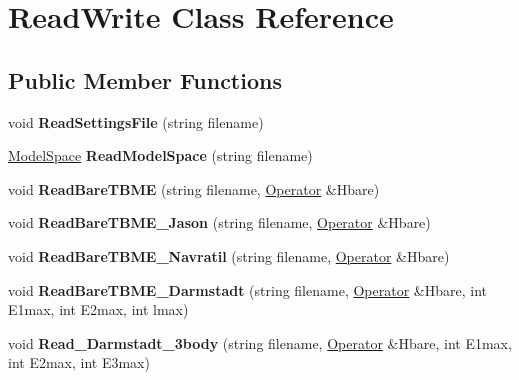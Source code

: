 \hypertarget{classReadWrite}{\section{Read\-Write Class Reference}
\label{classReadWrite}
}
\subsection*{Public Member Functions}
\begin{DoxyCompactItemize}
\item 
\hypertarget{classReadWrite_a7074f8c5e6b1bbeb90a4c534b913ac53}{void {\bfseries Read\-Settings\-File} (string filename)}\label{classReadWrite_a7074f8c5e6b1bbeb90a4c534b913ac53}

\item 
\hypertarget{classReadWrite_adbf1ad5fe47c97c87994cfc28df5c740}{\hyperlink{classModelSpace}{Model\-Space} {\bfseries Read\-Model\-Space} (string filename)}\label{classReadWrite_adbf1ad5fe47c97c87994cfc28df5c740}

\item 
\hypertarget{classReadWrite_a7ebe7ea4d8a322b23b144658da562277}{void {\bfseries Read\-Bare\-T\-B\-M\-E} (string filename, \hyperlink{classOperator}{Operator} \&Hbare)}\label{classReadWrite_a7ebe7ea4d8a322b23b144658da562277}

\item 
\hypertarget{classReadWrite_ae5271000cceab5fcebab7e9d2faf9f1f}{void {\bfseries Read\-Bare\-T\-B\-M\-E\-\_\-\-Jason} (string filename, \hyperlink{classOperator}{Operator} \&Hbare)}\label{classReadWrite_ae5271000cceab5fcebab7e9d2faf9f1f}

\item 
\hypertarget{classReadWrite_ab66f5d7e2e352e973597915c08cad45d}{void {\bfseries Read\-Bare\-T\-B\-M\-E\-\_\-\-Navratil} (string filename, \hyperlink{classOperator}{Operator} \&Hbare)}\label{classReadWrite_ab66f5d7e2e352e973597915c08cad45d}

\item 
\hypertarget{classReadWrite_a7d1ea6782d893eab0217bb965fba990e}{void {\bfseries Read\-Bare\-T\-B\-M\-E\-\_\-\-Darmstadt} (string filename, \hyperlink{classOperator}{Operator} \&Hbare, int E1max, int E2max, int lmax)}\label{classReadWrite_a7d1ea6782d893eab0217bb965fba990e}

\item 
\hypertarget{classReadWrite_a84c0cbaf2be415eadffb560ea0bb9785}{void {\bfseries Read\-\_\-\-Darmstadt\-\_\-3body} (string filename, \hyperlink{classOperator}{Operator} \&Hbare, int E1max, int E2max, int E3max)}\label{classReadWrite_a84c0cbaf2be415eadffb560ea0bb9785}


\end{DoxyCompactItemize}
